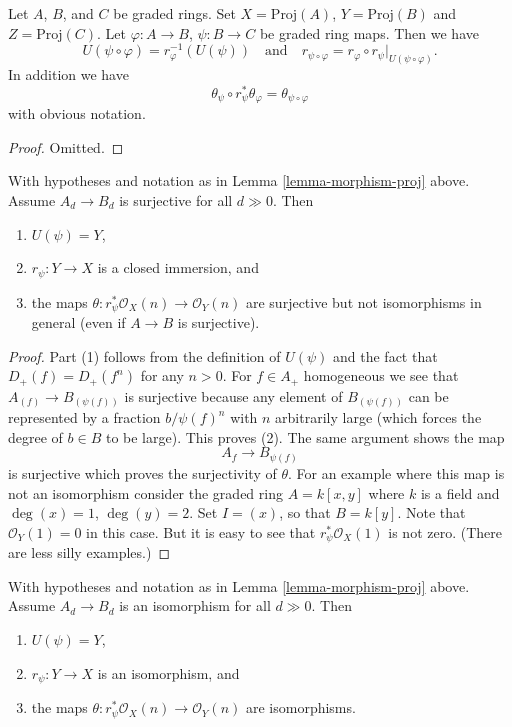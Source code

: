 \begin{lemma}
\label{lemma-morphism-proj-transitive}
Let $A$, $B$, and $C$ be graded rings.
Set $X = \text{Proj}(A)$, $Y = \text{Proj}(B)$ and $Z = \text{Proj}(C)$.
Let $\varphi : A \to B$, $\psi : B \to C$ be graded ring maps.
Then we have
$$
U(\psi \circ \varphi) = r_\varphi^{-1}(U(\psi))
\quad
\text{and}
\quad
r_{\psi \circ \varphi}
=
r_\varphi \circ r_\psi|_{U(\psi \circ \varphi)}.
$$
In addition we have
$$
\theta_\psi \circ r_\psi^*\theta_\varphi
=
\theta_{\psi \circ \varphi}
$$
with obvious notation.
\end{lemma}

\begin{proof}
Omitted.
\end{proof}

\begin{lemma}
\label{lemma-surjective-graded-rings-map-proj}
With hypotheses and notation as in Lemma \ref{lemma-morphism-proj} above.
Assume $A_d \to B_d$ is surjective for all $d \gg 0$. Then
\begin{enumerate}
\item $U(\psi) = Y$,
\item $r_\psi : Y \to X$ is a closed immersion, and
\item the maps $\theta : r_\psi^*\mathcal{O}_X(n) \to \mathcal{O}_Y(n)$
are surjective but not isomorphisms in general (even if $A \to B$ is
surjective).
\end{enumerate}
\end{lemma}

\begin{proof}
Part (1) follows from the definition of $U(\psi)$ and the fact that
$D_{+}(f) = D_{+}(f^n)$ for any $n > 0$. For $f \in A_{+}$ homogeneous
we see that $A_{(f)} \to B_{(\psi(f))}$ is surjective because
any element of $B_{(\psi(f))}$ can be represented by a fraction
$b/\psi(f)^n$ with $n$ arbitrarily large (which forces the degree of
$b \in B$ to be large). This proves (2).
The same argument shows the map
$$
A_f \to B_{\psi(f)}
$$
is surjective which proves the surjectivity of $\theta$.
For an example where this map is not an isomorphism
consider the graded ring $A = k[x, y]$ where $k$ is a field
and $\deg(x) = 1$, $\deg(y) = 2$. Set $I = (x)$, so that
$B = k[y]$. Note that $\mathcal{O}_Y(1) = 0$ in this case.
But it is easy to see that $r_\psi^*\mathcal{O}_X(1)$
is not zero. (There are less silly examples.)
\end{proof}

\begin{lemma}
\label{lemma-eventual-iso-graded-rings-map-proj}
With hypotheses and notation as in Lemma \ref{lemma-morphism-proj} above.
Assume $A_d \to B_d$ is an isomorphism for all $d \gg 0$. Then
\begin{enumerate}
\item $U(\psi) = Y$,
\item $r_\psi : Y \to X$ is an isomorphism, and
\item the maps $\theta : r_\psi^*\mathcal{O}_X(n) \to \mathcal{O}_Y(n)$
are isomorphisms.
\end{enumerate}
\end{lemma}

